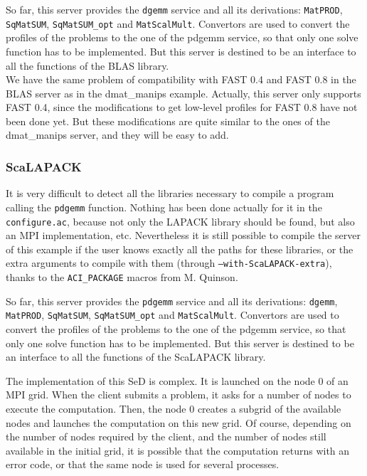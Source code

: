 So far, this server provides the \texttt{dgemm} service and all its derivations:
\texttt{MatPROD}, \texttt{SqMatSUM}, \texttt{SqMatSUM\_opt} and
\texttt{MatScalMult}. Convertors are used to convert the profiles of the
problems to the one of the pdgemm service, so that only one solve function has
to be implemented. But this server is destined to be an interface to all the
functions of the BLAS library.
\\

We have the same problem of compatibility with FAST 0.4 and FAST 0.8 in the BLAS
server as in the dmat\_manips example. Actually, this server only supports
FAST 0.4, since the modifications to get low-level profiles for FAST 0.8 have not
been done yet. But these modifications are quite similar to the ones of the
dmat\_manips server, and they will be easy to add.

\subsubsection{ScaLAPACK}

It is very difficult to detect all the libraries necessary to compile a program
calling the \texttt{pdgemm} function. Nothing has been done actually for it in
the \texttt{configure.ac}, because not only the LAPACK library should be found,
but also an MPI implementation, etc. Nevertheless it is still possible to
compile the server of this example if the user knows exactly all the paths for
these libraries, or the extra arguments to compile with them (through
\texttt{--with-ScaLAPACK-extra}), thanks to the \texttt{ACI\_PACKAGE} macros
from M. Quinson.

So far, this server provides the \texttt{pdgemm} service and all its
derivations: \texttt{dgemm}, \texttt{MatPROD}, \texttt{SqMatSUM},
\texttt{SqMatSUM\_opt} and \texttt{MatScalMult}. Convertors are used to convert
the profiles of the problems to the one of the pdgemm service, so that only one
solve function has to be implemented. But this server is destined to be an
interface to all the functions of the ScaLAPACK library.

The implementation of this SeD is complex. It is launched on the node 0 of an
MPI grid. When the client submits a problem, it asks for a number of nodes to
execute the computation. Then, the node 0 creates a subgrid of the available
nodes and launches the computation on this new grid. Of course, depending on the
number of nodes required by the client, and the number of nodes still available
in the initial grid, it is possible that the computation returns with an error
code, or that the same node is used for several processes.
\\

